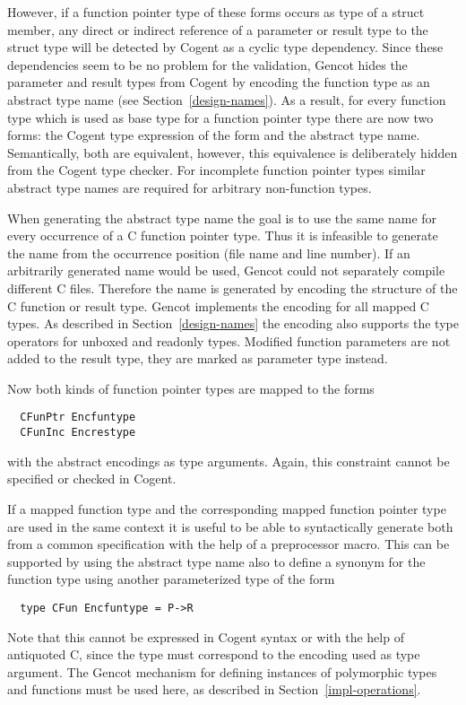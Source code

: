However, if a function pointer type of these forms occurs as type of a struct member, any direct or indirect reference of a
parameter or result type to the struct type will be detected by Cogent as a cyclic type dependency. Since 
these dependencies seem to be no problem for the validation, Gencot hides the parameter and result types from
Cogent by encoding the function type as an abstract type name (see Section~\ref{design-names}). As a result, for 
every function type which is used as base type for a function pointer type there are now two forms: the Cogent
type expression of the form  and the abstract type name. Semantically, both are equivalent, however,
this equivalence is deliberately hidden from the Cogent type checker. For incomplete function pointer types similar
abstract type names are required for arbitrary non-function types.

When generating the abstract type name the goal is to use the same name 
for every occurrence of a C function pointer type. Thus it is infeasible to generate the name from 
the occurrence position (file name and line number). If an arbitrarily generated name would be used, 
Gencot could not separately compile different C files. Therefore the name is generated by encoding the structure of the 
C function or result type. Gencot implements the encoding for all mapped C types. As described
in Section~\ref{design-names} the encoding also supports the type operators for unboxed and readonly types.
Modified function parameters are not added to the result type, they are marked as parameter type instead.

Now both kinds of function pointer types are mapped to the forms
\begin{verbatim}
  CFunPtr Encfuntype
  CFunInc Encrestype
\end{verbatim}
with the abstract encodings as type arguments. Again, this constraint cannot be specified or checked in Cogent.

If a mapped function type and the corresponding mapped function pointer type are used in the same context it is useful to 
be able to syntactically generate both from a common specification with the help of a preprocessor macro. This can be
supported by using the abstract type name also to define a synonym for the function type using another parameterized
type of the form
\begin{verbatim}
  type CFun Encfuntype = P->R
\end{verbatim}
Note that this cannot be expressed in Cogent syntax or with the help of antiquoted C, since the type  must
correspond to the encoding used as type argument. The Gencot mechanism for defining instances of polymorphic types and
functions must be used here, as described in Section~\ref{impl-operations}.

